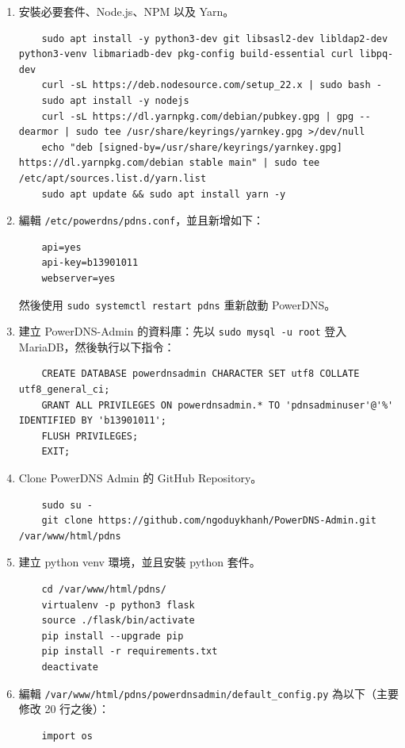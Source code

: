 \begin{enumerate}
  \item 安裝必要套件、Node.js、NPM 以及 Yarn。
  \begin{verbatim}
    sudo apt install -y python3-dev git libsasl2-dev libldap2-dev python3-venv libmariadb-dev pkg-config build-essential curl libpq-dev
    curl -sL https://deb.nodesource.com/setup_22.x | sudo bash -
    sudo apt install -y nodejs
    curl -sL https://dl.yarnpkg.com/debian/pubkey.gpg | gpg --dearmor | sudo tee /usr/share/keyrings/yarnkey.gpg >/dev/null
    echo "deb [signed-by=/usr/share/keyrings/yarnkey.gpg] https://dl.yarnpkg.com/debian stable main" | sudo tee /etc/apt/sources.list.d/yarn.list
    sudo apt update && sudo apt install yarn -y
  \end{verbatim}
  \item 編輯 \texttt{/etc/powerdns/pdns.conf}，並且新增如下：
  \begin{verbatim}
    api=yes
    api-key=b13901011
    webserver=yes
  \end{verbatim}
    然後使用 \texttt{sudo systemctl restart pdns} 重新啟動 PowerDNS。
  \item 建立 PowerDNS-Admin 的資料庫：先以 \texttt{sudo mysql -u root} 登入 MariaDB，然後執行以下指令：
    {
      \small
  \begin{verbatim}
    CREATE DATABASE powerdnsadmin CHARACTER SET utf8 COLLATE utf8_general_ci;
    GRANT ALL PRIVILEGES ON powerdnsadmin.* TO 'pdnsadminuser'@'%' IDENTIFIED BY 'b13901011';
    FLUSH PRIVILEGES;
    EXIT;
  \end{verbatim}
    }

  \item Clone PowerDNS Admin 的 GitHub Repository。
  \begin{verbatim}
    sudo su -
    git clone https://github.com/ngoduykhanh/PowerDNS-Admin.git /var/www/html/pdns
  \end{verbatim}
  \item 建立 python venv 環境，並且安裝 python 套件。
  \begin{verbatim}
    cd /var/www/html/pdns/
    virtualenv -p python3 flask
    source ./flask/bin/activate
    pip install --upgrade pip
    pip install -r requirements.txt
    deactivate
  \end{verbatim}
  \item 編輯 \texttt{/var/www/html/pdns/powerdnsadmin/default\_config.py} 為以下（主要修改 20 行之後）：
  \begin{verbatim}
    import os


\end{verbatim}
\end{enumerate}
